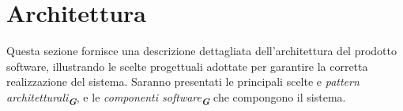 

\section{Architettura}
\label{sec:architettura}

Questa sezione fornisce una descrizione dettagliata dell'architettura del prodotto software, illustrando le scelte progettuali adottate per garantire la corretta realizzazione del sistema. Saranno presentati le principali scelte e \emph{pattern architetturali}\textsubscript{\textbf{\textit{G}}}, e le \emph{componenti software}\textsubscript{\textbf{\textit{G}}} che compongono il sistema.
